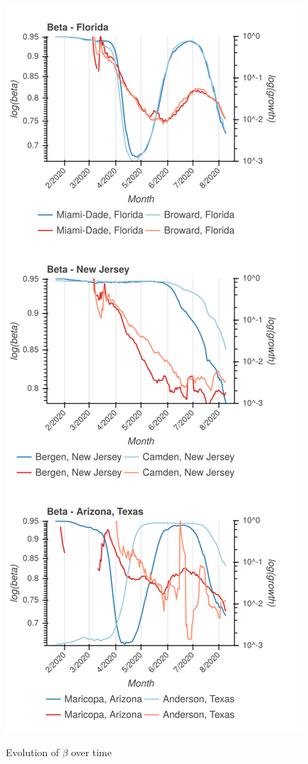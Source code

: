 \documentclass[nobib]{tufte-handout}
\begin{document}
\begin{marginfigure}[-4em]

\includegraphics[width=\columnwidth]{img/betas.png}
\caption{Evolution of \(\beta\) over time}
\end{marginfigure}
\end{document}
